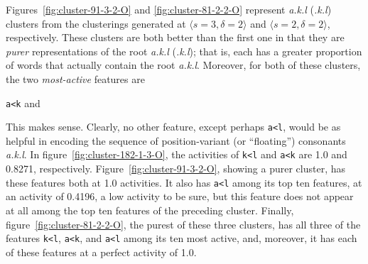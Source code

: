 Figures~\ref{fig:cluster-91-3-2-O} and \ref{fig:cluster-81-2-2-O} represent \textit{a.k.l}
(\textit{.k.l}) clusters from the clusterings generated at
$\langle{s}=3,\delta=2 \rangle$ and $\langle s=2, \delta=2 \rangle$, respectively. 
These clusters are both better than the first one in that they are
\emph{purer} representations of the root \textit{a.k.l} (\textit{.k.l}); that is,
each has a greater proportion of words that actually contain the root \textit{a.k.l}.
Moreover, for both of these clusters, the two \emph{most-active} features are 
\begin{center}
 {\large \texttt{a<k}} \quad  and 
\end{center}
This makes sense. Clearly, no other feature, except perhaps \texttt{a<l}, would be as helpful in 
encoding the sequence of  position-variant (or ``floating'') consonants \textit{a.k.l}. In figure~\ref{fig:cluster-182-1-3-O}, the activities of \texttt{k<l} and \texttt{a<k} are 1.0 and 0.8271, respectively.
Figure~\ref{fig:cluster-91-3-2-O}, showing a purer cluster, has these features both at 1.0 activities. It also has \texttt{a<l} among its top ten features, 
at an activity of 0.4196, a low activity to be sure, but this feature does not appear at all among the top ten features of the preceding
cluster. 
Finally, figure~\ref{fig:cluster-81-2-2-O}, the purest of these three clusters, has all three of the features \texttt{k<l}, \texttt{a<k}, and \texttt{a<l} among
its ten most active,
and, moreover, it has each of these features at a perfect activity of 1.0.

